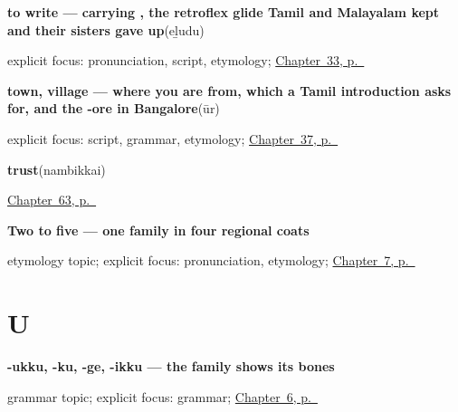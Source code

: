 \noindent\begin{minipage}[t]{\linewidth}
\raggedright
\textbf{to write — carrying , the retroflex glide Tamil and Malayalam kept and their sisters gave up}\enspace\emph{}\enspace(eḻudu)\par
\footnotesize explicit focus: pronunciation, script, etymology; \hyperref[ch:ta-verbs-of-the-mind]{Chapter~33, p.~\pageref*{ch:ta-verbs-of-the-mind}}
\end{minipage}\par\smallskip

\noindent\begin{minipage}[t]{\linewidth}
\raggedright
\textbf{town, village — where you are from, which a Tamil introduction asks for, and the -ore in Bangalore}\enspace\emph{}\enspace(ūr)\par
\footnotesize explicit focus: script, grammar, etymology; \hyperref[ch:ta-your-town-your-friend]{Chapter~37, p.~\pageref*{ch:ta-your-town-your-friend}}
\end{minipage}\par\smallskip

\noindent\begin{minipage}[t]{\linewidth}
\raggedright
\textbf{trust}\enspace\emph{}\enspace(nambikkai)\par
\footnotesize \hyperref[ch:ta-asking-well]{Chapter~63, p.~\pageref*{ch:ta-asking-well}}
\end{minipage}\par\smallskip

\noindent\begin{minipage}[t]{\linewidth}
\raggedright
\textbf{Two to five — one family in four regional coats}\par
\footnotesize etymology topic; explicit focus: pronunciation, etymology; \hyperref[ch:ta-numbers-one-to-ten]{Chapter~7, p.~\pageref*{ch:ta-numbers-one-to-ten}}
\end{minipage}\par\smallskip

\section*{U}

\noindent\begin{minipage}[t]{\linewidth}
\raggedright
\textbf{-ukku, -ku, -ge, -ikku — the family shows its bones}\par
\footnotesize grammar topic; explicit focus: grammar; \hyperref[ch:ta-dative-case]{Chapter~6, p.~\pageref*{ch:ta-dative-case}}
\end{minipage}\par\smallskip

